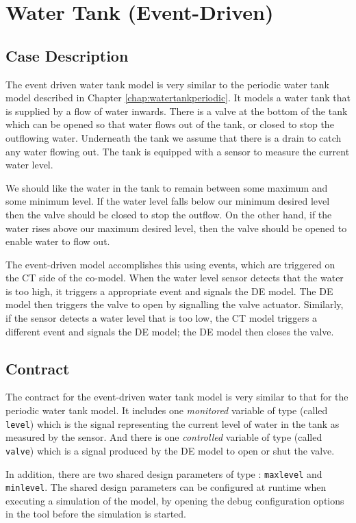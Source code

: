 \chapter{Water Tank (Event-Driven)} \label{chap:watertankeventdriven}
\section{Case Description}
The event driven water tank model is very similar to the periodic
water tank model described in Chapter \ref{chap:watertankperiodic}.
It models a water tank that is supplied by a flow of water inwards.
There is a valve at the bottom of the tank which can be opened so that
water flows out of the tank, or closed to stop the outflowing water.
Underneath the tank we assume that there is a drain to catch any water
flowing out.  The tank is equipped with a sensor to measure the
current water level.

We should like the water in the tank to remain between some maximum
and some minimum level.  If the water level falls below our minimum
desired level then the valve should be closed to stop the outflow.  On
the other hand, if the water rises above our maximum desired level,
then the valve should be opened to enable water to flow out.

The event-driven model accomplishes this using events, which are
triggered on the CT side of the co-model.  When the water level sensor
detects that the water is too high, it triggers a appropriate event
and signals the DE model.  The DE model then triggers the valve to
open by signalling the valve actuator.  Similarly, if the sensor
detects a water level that is too low, the CT model triggers a
different event and signals the DE model; the DE model then closes the
valve.

\section{Contract}
The contract for the event-driven water tank model is very similar to
that for the periodic water tank model.  It includes one
\emph{monitored} variable of type  (called \texttt{level})
which is the signal representing the current level of water in the
tank as measured by the sensor.  And there is one \emph{controlled}
variable of type  (called \texttt{valve}) which is a signal
produced by the DE model to open or shut the valve.

In addition, there are two shared design parameters of type
: \texttt{maxlevel} and \texttt{minlevel}.  The shared
design parameters can be configured at runtime when executing a
simulation of the model, by opening the debug configuration options in
the \DESTECS tool before the simulation is started.

